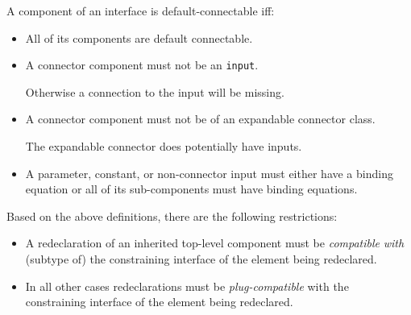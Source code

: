 \begin{definition}
A component of an interface is default-connectable iff:
\begin{itemize}
\item
  All of its components are default connectable.
\item
  A connector component must not be an \lstinline!input!.
  \begin{nonnormative}
  Otherwise a connection to the input will be missing.
  \end{nonnormative}
\item
  A connector component must not be of an expandable connector class.
  \begin{nonnormative}
  The expandable connector does potentially have inputs.
  \end{nonnormative}
\item
  A parameter, constant, or non-connector input must either have a
  binding equation or all of its sub-components must have binding
  equations.
\end{itemize}
\end{definition}

Based on the above definitions, there are the following restrictions:
\begin{itemize}
\item
  A redeclaration of an inherited top-level component must be
  \emph{compatible} \emph{with} (subtype of) the constraining interface
  of the element being redeclared.
\item
  In all other cases redeclarations must be \emph{plug-compatible} with
  the constraining interface of the element being redeclared.
\end{itemize}


